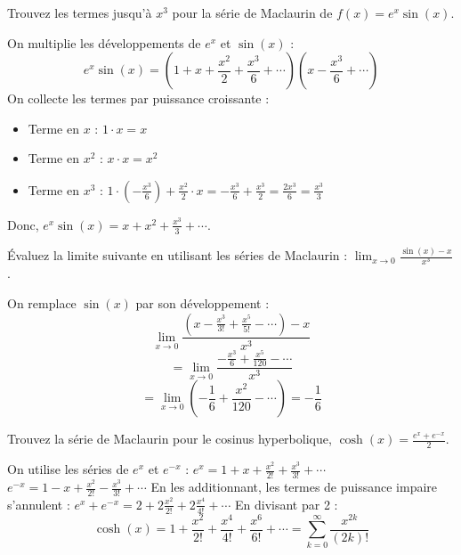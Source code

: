 \begin{exercicebox}
Trouvez les termes jusqu'à $x^3$ pour la série de Maclaurin de $f(x) = e^x \sin(x)$.
\end{exercicebox}

\begin{correctionbox}
On multiplie les développements de $e^x$ et $\sin(x)$ :
$$ e^x \sin(x) = \left(1 + x + \frac{x^2}{2} + \frac{x^3}{6} + \cdots\right) \left(x - \frac{x^3}{6} + \cdots\right) $$
On collecte les termes par puissance croissante :
\begin{itemize}
    \item Terme en $x$ : $1 \cdot x = x$
    \item Terme en $x^2$ : $x \cdot x = x^2$
    \item Terme en $x^3$ : $1 \cdot (-\frac{x^3}{6}) + \frac{x^2}{2} \cdot x = -\frac{x^3}{6} + \frac{x^3}{2} = \frac{2x^3}{6} = \frac{x^3}{3}$
\end{itemize}
Donc, $e^x \sin(x) = x + x^2 + \frac{x^3}{3} + \cdots$.
\end{correctionbox}

\begin{exercicebox}
Évaluez la limite suivante en utilisant les séries de Maclaurin : $ \lim_{x \to 0} \frac{\sin(x) - x}{x^3} $.
\end{exercicebox}

\begin{correctionbox}
On remplace $\sin(x)$ par son développement :
$$ \lim_{x \to 0} \frac{(x - \frac{x^3}{3!} + \frac{x^5}{5!} - \cdots) - x}{x^3} $$
$$ = \lim_{x \to 0} \frac{-\frac{x^3}{6} + \frac{x^5}{120} - \cdots}{x^3} $$
$$ = \lim_{x \to 0} \left(-\frac{1}{6} + \frac{x^2}{120} - \cdots\right) = -\frac{1}{6} $$
\end{correctionbox}

\begin{exercicebox}
Trouvez la série de Maclaurin pour le cosinus hyperbolique, $\cosh(x) = \frac{e^x + e^{-x}}{2}$.
\end{exercicebox}

\begin{correctionbox}
On utilise les séries de $e^x$ et $e^{-x}$ :
$e^x = 1 + x + \frac{x^2}{2!} + \frac{x^3}{3!} + \cdots$
$e^{-x} = 1 - x + \frac{x^2}{2!} - \frac{x^3}{3!} + \cdots$
En les additionnant, les termes de puissance impaire s'annulent :
$e^x + e^{-x} = 2 + 2\frac{x^2}{2!} + 2\frac{x^4}{4!} + \cdots$
En divisant par 2 :
$$ \cosh(x) = 1 + \frac{x^2}{2!} + \frac{x^4}{4!} + \frac{x^6}{6!} + \cdots = \sum_{k=0}^{\infty} \frac{x^{2k}}{(2k)!} $$
\end{correctionbox}

